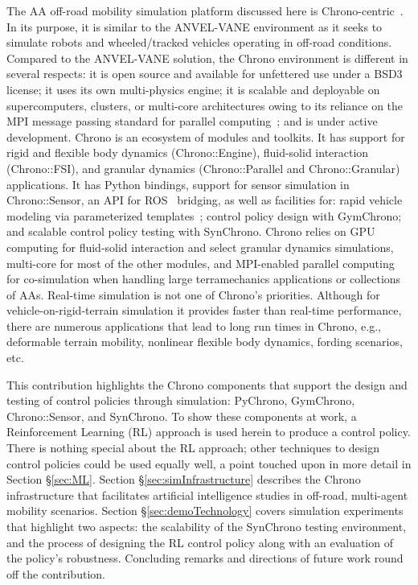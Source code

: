 \documentclass[12pt,twocolumn]{article}
\begin{document}
The AA off-road mobility simulation platform discussed here is Chrono-centric~\cite{projectChronoWebSite,chronoOverview2016}. In its purpose, it is similar to the ANVEL-VANE environment as it seeks to simulate robots and wheeled/tracked vehicles operating in off-road conditions. Compared to the ANVEL-VANE solution, the Chrono environment is different in several respects: it is open source and available for unfettered use under a BSD3 license; it uses its own multi-physics engine; it is scalable and deployable on supercomputers, clusters, or multi-core architectures owing to its reliance on the MPI message passing standard for parallel computing~\cite{MPI-Forum-1994}; and is under active development. Chrono is an ecosystem of modules and toolkits. It has support for rigid and flexible body dynamics (Chrono::Engine), fluid-solid interaction (Chrono::FSI), and granular dynamics (Chrono::Parallel and Chrono::Granular) applications. It has Python bindings, support for sensor simulation in Chrono::Sensor, an API for ROS~\cite{ROS-2009} bridging, as well as facilities for: rapid vehicle modeling via parameterized templates~\cite{ChronoVehicle2019}; control policy design with GymChrono; and scalable control policy testing with SynChrono. Chrono relies on GPU computing for fluid-solid interaction and select granular dynamics simulations, multi-core for most of the other modules, and MPI-enabled parallel computing for co-simulation when handling large terramechanics applications or collections of AAs. Real-time simulation is not one of Chrono's priorities. Although for vehicle-on-rigid-terrain simulation it provides faster than real-time performance, there are numerous applications that lead to long run times in Chrono, e.g., deformable terrain mobility, nonlinear flexible body dynamics, fording scenarios, etc. 

This contribution highlights the Chrono components that support the design and testing of control policies through simulation: PyChrono, GymChrono, Chrono::Sensor, and SynChrono. To show these components at work, a Reinforcement Learning (RL) approach is used herein to produce a control policy. There is nothing special about the RL approach; other techniques to design control policies could be used equally well, a point touched upon in more detail in Section \S\ref{sec:ML}. Section \S\ref{sec:simInfrastructure} describes the Chrono infrastructure that facilitates artificial intelligence studies in off-road, multi-agent mobility scenarios. Section \S\ref{sec:demoTechnology} covers simulation experiments that highlight two aspects: the scalability of the SynChrono testing environment, and the process of designing the RL control policy along with an evaluation of the policy's robustness. Concluding remarks and directions of future work round off the contribution. 
\end{document}
